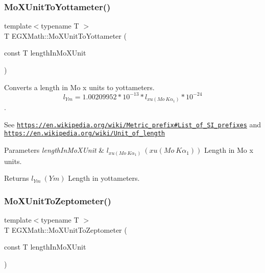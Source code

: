 \subsubsection{\texorpdfstring{Mo\+X\+Unit\+To\+Yottameter()}{MoXUnitToYottameter()}}
{\footnotesize\ttfamily template$<$typename T $>$ \\
T E\+G\+X\+Math\+::\+Mo\+X\+Unit\+To\+Yottameter (\begin{DoxyParamCaption}\item[{const T}]{length\+In\+Mo\+X\+Unit }\end{DoxyParamCaption})}



Converts a length in Mo x units to yottameters. \[ l_{Ym}=1.00209952*10^{-13} * l_{xu(Mo\ K\alpha_1)} * 10^{-24} \]. 

See \href{https://en.wikipedia.org/wiki/Metric_prefix#List_of_SI_prefixes}{\tt https\+://en.\+wikipedia.\+org/wiki/\+Metric\+\_\+prefix\#\+List\+\_\+of\+\_\+\+S\+I\+\_\+prefixes} and \href{https://en.wikipedia.org/wiki/Unit_of_length}{\tt https\+://en.\+wikipedia.\+org/wiki/\+Unit\+\_\+of\+\_\+length} 
\begin{DoxyParams}{Parameters}
{\em length\+In\+Mo\+X\+Unit} & $ l_{xu(Mo\ K\alpha_1)}\ (xu(Mo\ K\alpha_1))$ Length in Mo x units. \\
\hline
\end{DoxyParams}
\begin{DoxyReturn}{Returns}
$ l_{Ym}\ (Ym)$ Length in yottameters. 
\end{DoxyReturn}
\mbox{\label{group___e_g_x_math-_conversions-_length_conversions-_non-_s_i-_mo_x_unit-_s_i_gaab354c6959e3f8243ea2be8b9e500727}} 
\subsubsection{\texorpdfstring{Mo\+X\+Unit\+To\+Zeptometer()}{MoXUnitToZeptometer()}}
{\footnotesize\ttfamily template$<$typename T $>$ \\
T E\+G\+X\+Math\+::\+Mo\+X\+Unit\+To\+Zeptometer (\begin{DoxyParamCaption}\item[{const T}]{length\+In\+Mo\+X\+Unit }\end{DoxyParamCaption})}



